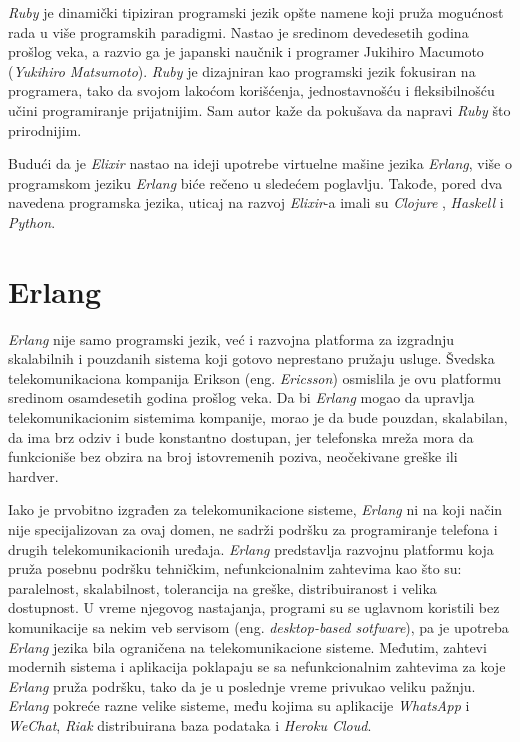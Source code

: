 \documentclass[12pt,oneside]{memoir}
\begin{document}
\emph{Ruby} je dinamički tipiziran programski jezik opšte namene koji pruža mogućnost rada u više
programskih paradigmi. Nastao je sredinom devedesetih godina prošlog veka, a razvio ga je 
japanski naučnik i programer Jukihiro Macumoto (\emph{Yukihiro Matsumoto}). \emph{Ruby} je dizajniran
kao programski jezik fokusiran na programera, tako da svojom lakoćom korišćenja, jednostavnošću i 
fleksibilnošću učini programiranje prijatnijim. Sam autor kaže da pokušava da napravi \emph{Ruby} 
što prirodnijim.  

Budući da je \emph{Elixir} nastao na ideji upotrebe virtuelne mašine jezika \emph{Erlang}, više o programskom jeziku \emph{Erlang} biće rečeno
u sledećem poglavlju. Takođe, pored dva navedena programska jezika, uticaj na razvoj \emph{Elixir}-a 
imali su \emph{Clojure} \cite{clojure}, \emph{Haskell}\cite{haskell} i \emph{Python}\cite{python}.

\section{Erlang}
\emph{Erlang} nije samo programski jezik, već i razvojna platforma za izgradnju skalabilnih i pouzdanih
sistema koji gotovo neprestano pružaju usluge. Švedska telekomunikaciona kompanija Erikson (eng.
\emph{Ericsson}) osmislila je ovu platformu sredinom  osamdesetih godina prošlog veka. 
Da bi \emph{Erlang} mogao da upravlja telekomunikacionim sistemima kompanije, morao
je da bude pouzdan, skalabilan, da ima brz odziv i bude konstantno dostupan, jer telefonska mreža
mora da funkcioniše bez obzira na broj istovremenih poziva, neočekivane greške ili hardver.

Iako je prvobitno izgrađen za telekomunikacione sisteme, \emph{Erlang} ni na koji način nije 
specijalizovan za ovaj domen, ne sadrži podršku za programiranje telefona i drugih 
telekomunikacionih uređaja. \emph{Erlang} predstavlja razvojnu platformu koja pruža posebnu podršku
tehničkim, nefunkcionalnim zahtevima kao što su: paralelnost, skalabilnost, tolerancija na
greške, distribuiranost i velika dostupnost. U vreme njegovog nastajanja, programi su se uglavnom
koristili bez komunikacije sa nekim veb servisom (eng. \emph{desktop-based sotfware}), pa je 
upotreba \emph{Erlang} jezika bila ograničena na telekomunikacione sisteme. Međutim, zahtevi modernih 
sistema i aplikacija poklapaju se sa nefunkcionalnim zahtevima za koje \emph{Erlang} pruža podršku, tako
da je u poslednje vreme privukao veliku pažnju. \emph{Erlang} pokreće razne velike sisteme, među kojima
su aplikacije \emph{WhatsApp}\cite{whatsapp} i \emph{WeChat}\cite{wechat}, \emph{Riak}\cite{riak}  
distribuirana baza podataka i \emph{Heroku Cloud}\cite{heroku}.
\end{document}
